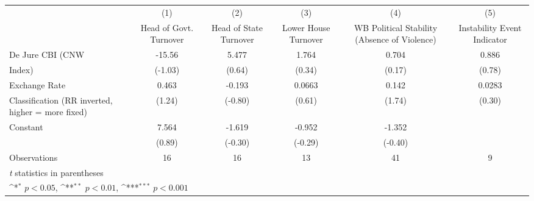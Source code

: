{
\def\sym#1{\ifmmode^{#1}\else\(^{#1}\)\fi}
\begin{tabular}{l*{5}{c}}
\hline\hline
                    &\multicolumn{1}{c}{(1)}&\multicolumn{1}{c}{(2)}&\multicolumn{1}{c}{(3)}&\multicolumn{1}{c}{(4)}&\multicolumn{1}{c}{(5)}\\
                    &\multicolumn{1}{c}{Head of Govt. Turnover}&\multicolumn{1}{c}{Head of State Turnover}&\multicolumn{1}{c}{Lower House Turnover}&\multicolumn{1}{c}{WB Political Stability (Absence of Violence)}&\multicolumn{1}{c}{Instability Event Indicator}\\
\hline
De Jure CBI (CNW    &      -15.56         &       5.477         &       1.764         &       0.704         &       0.886         \\
Index)              &     (-1.03)         &      (0.64)         &      (0.34)         &      (0.17)         &      (0.78)         \\
[1em]
Exchange Rate       &       0.463         &      -0.193         &      0.0663         &       0.142         &      0.0283         \\
Classification (RR inverted, higher = more fixed)&      (1.24)         &     (-0.80)         &      (0.61)         &      (1.74)         &      (0.30)         \\
[1em]
Constant            &       7.564         &      -1.619         &      -0.952         &      -1.352         &                     \\
                    &      (0.89)         &     (-0.30)         &     (-0.29)         &     (-0.40)         &                     \\
\hline
Observations        &          16         &          16         &          13         &          41         &           9         \\
\hline\hline
\multicolumn{6}{l}{\footnotesize \textit{t} statistics in parentheses}\\
\multicolumn{6}{l}{\footnotesize \sym{*} \(p<0.05\), \sym{**} \(p<0.01\), \sym{***} \(p<0.001\)}\\
\end{tabular}
}
